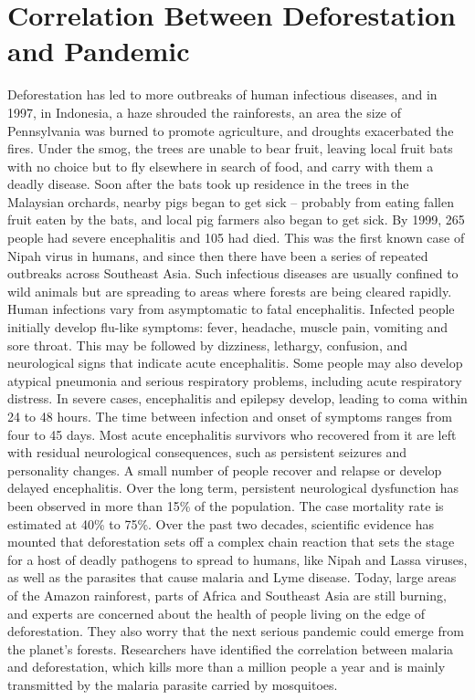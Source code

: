 \documentclass{book}\usepackage{knitr}
\begin{document}
{\section{Correlation Between Deforestation and Pandemic}
Deforestation has led to more outbreaks of human infectious diseases, and in 1997, in Indonesia, a haze shrouded the rainforests, an area the size of Pennsylvania was burned to promote agriculture, and droughts exacerbated the fires. Under the smog, the trees are unable to bear fruit, leaving local fruit bats with no choice but to fly elsewhere in search of food, and carry with them a deadly disease. Soon after the bats took up residence in the trees in the Malaysian orchards, nearby pigs began to get sick -- probably from eating fallen fruit eaten by the bats, and local pig farmers also began to get sick. By 1999, 265 people had severe encephalitis and 105 had died. This was the first known case of Nipah virus in humans, and since then there have been a series of repeated outbreaks across Southeast Asia. Such infectious diseases are usually confined to wild animals but are spreading to areas where forests are being cleared rapidly. Human infections vary from asymptomatic to fatal encephalitis. Infected people initially develop flu-like symptoms: fever, headache, muscle pain, vomiting and sore throat. This may be followed by dizziness, lethargy, confusion, and neurological signs that indicate acute encephalitis. Some people may also develop atypical pneumonia and serious respiratory problems, including acute respiratory distress. In severe cases, encephalitis and epilepsy develop, leading to coma within 24 to 48 hours. The time between infection and onset of symptoms ranges from four to 45 days. Most acute encephalitis survivors who recovered from it are left with residual neurological consequences, such as persistent seizures and personality changes. A small number of people recover and relapse or develop delayed encephalitis. Over the long term, persistent neurological dysfunction has been observed in more than 15\% of the population. The case mortality rate is estimated at 40\% to 75\%. Over the past two decades, scientific evidence has mounted that deforestation sets off a complex chain reaction that sets the stage for a host of deadly pathogens to spread to humans, like Nipah and Lassa viruses, as well as the parasites that cause malaria and Lyme disease. Today, large areas of the Amazon rainforest, parts of Africa and Southeast Asia are still burning, and experts are concerned about the health of people living on the edge of deforestation. They also worry that the next serious pandemic could emerge from the planet's forests. Researchers have identified the correlation between malaria and deforestation, which kills more than a million people a year and is mainly transmitted by the malaria parasite carried by mosquitoes.

}
\end{document}
